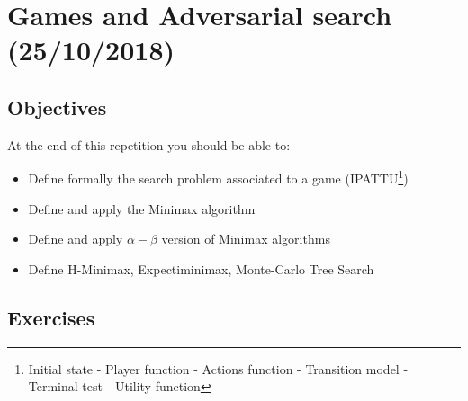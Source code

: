 \documentclass[a4paper, 10pt]{article}
\begin{document}


   \newpage
   \setcounter{page}{1}
   \section{Games and Adversarial search (25/10/2018)}
   \subsection{Objectives}
    At the end of this repetition you should be able to:
   \begin{itemize}
       \item Define formally the search problem associated to a game (IPATTU\footnote{Initial state - Player function - Actions function - Transition model - Terminal test - Utility function})
       \item Define and apply the Minimax algorithm
       \item Define and apply $\alpha-\beta$ version of Minimax algorithms
       \item Define H-Minimax, Expectiminimax, Monte-Carlo Tree Search
   \end{itemize}
   \subsection{Exercises}
\end{document}
